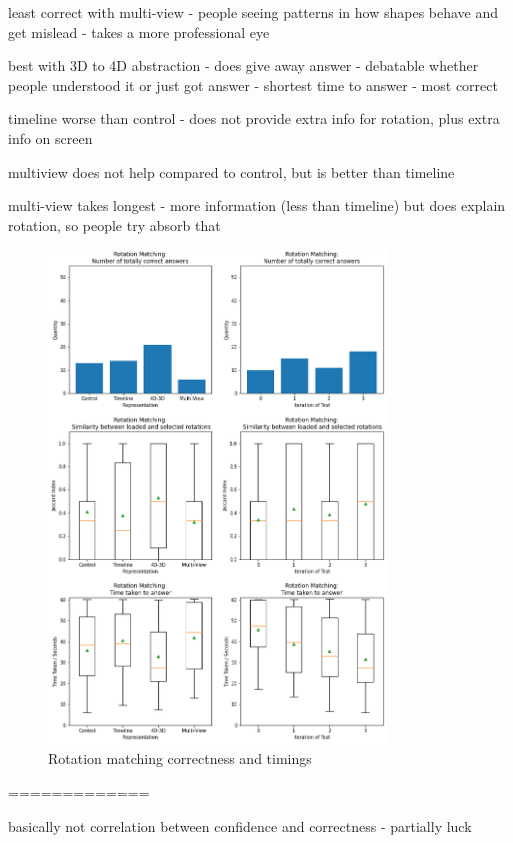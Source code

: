 \documentclass{l4proj}
\begin{document}
least correct with multi-view
 - people seeing patterns in how shapes behave and get mislead - takes a more professional eye

best with 3D to 4D abstraction
 - does give away answer - debatable whether people understood it or just got answer
 - shortest time to answer
 - most correct

timeline worse than control - does not provide extra info for rotation, plus extra info on screen

multiview does not help compared to control, but is better than timeline

multi-view takes longest - more information (less than timeline) but does explain rotation, so people try absorb that

\begin{figure}
  \centering
  \includegraphics[width=0.8\textwidth]{images/results/rotation_matching_stats.png}
  \caption{Rotation matching correctness and timings}
  \label{fig:rot_stats}
\end{figure}

=============

basically not correlation between confidence and correctness - partially luck
\end{document}
